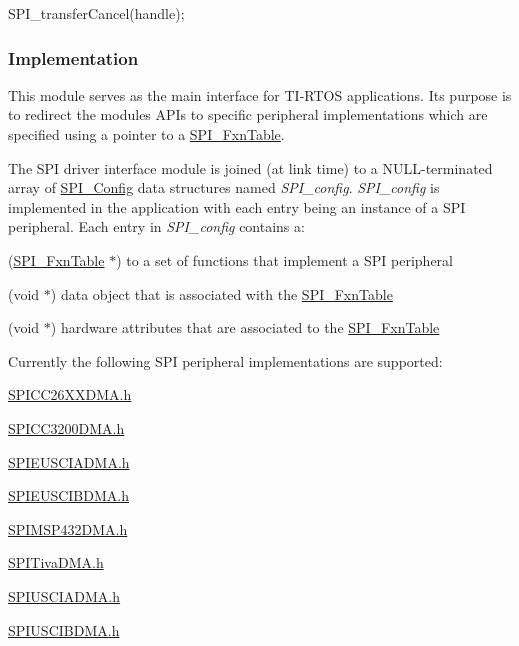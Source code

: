 \begin{DoxyCode}
SPI_transferCancel(handle);
\end{DoxyCode}


\subsubsection*{Implementation}

This module serves as the main interface for T\+I-\/\+R\+T\+O\+S applications. Its purpose is to redirect the module\textquotesingle{}s A\+P\+Is to specific peripheral implementations which are specified using a pointer to a \hyperlink{struct_s_p_i___fxn_table}{S\+P\+I\+\_\+\+Fxn\+Table}.

The S\+P\+I driver interface module is joined (at link time) to a N\+U\+L\+L-\/terminated array of \hyperlink{struct_s_p_i___config}{S\+P\+I\+\_\+\+Config} data structures named {\itshape S\+P\+I\+\_\+config}. {\itshape S\+P\+I\+\_\+config} is implemented in the application with each entry being an instance of a S\+P\+I peripheral. Each entry in {\itshape S\+P\+I\+\_\+config} contains a\+:
\begin{DoxyItemize}
\item (\hyperlink{struct_s_p_i___fxn_table}{S\+P\+I\+\_\+\+Fxn\+Table} $\ast$) to a set of functions that implement a S\+P\+I peripheral
\item (void $\ast$) data object that is associated with the \hyperlink{struct_s_p_i___fxn_table}{S\+P\+I\+\_\+\+Fxn\+Table}
\item (void $\ast$) hardware attributes that are associated to the \hyperlink{struct_s_p_i___fxn_table}{S\+P\+I\+\_\+\+Fxn\+Table}
\end{DoxyItemize}

Currently the following S\+P\+I peripheral implementations are supported\+:
\begin{DoxyItemize}
\item \hyperlink{_s_p_i_c_c26_x_x_d_m_a_8h}{S\+P\+I\+C\+C26\+X\+X\+D\+M\+A.\+h}
\item \hyperlink{_s_p_i_c_c3200_d_m_a_8h}{S\+P\+I\+C\+C3200\+D\+M\+A.\+h}
\item \hyperlink{_s_p_i_e_u_s_c_i_a_d_m_a_8h}{S\+P\+I\+E\+U\+S\+C\+I\+A\+D\+M\+A.\+h}
\item \hyperlink{_s_p_i_e_u_s_c_i_b_d_m_a_8h}{S\+P\+I\+E\+U\+S\+C\+I\+B\+D\+M\+A.\+h}
\item \hyperlink{_s_p_i_m_s_p432_d_m_a_8h}{S\+P\+I\+M\+S\+P432\+D\+M\+A.\+h}
\item \hyperlink{_s_p_i_tiva_d_m_a_8h}{S\+P\+I\+Tiva\+D\+M\+A.\+h}
\item \hyperlink{_s_p_i_u_s_c_i_a_d_m_a_8h}{S\+P\+I\+U\+S\+C\+I\+A\+D\+M\+A.\+h}
\item \hyperlink{_s_p_i_u_s_c_i_b_d_m_a_8h}{S\+P\+I\+U\+S\+C\+I\+B\+D\+M\+A.\+h}
\end{DoxyItemize}

